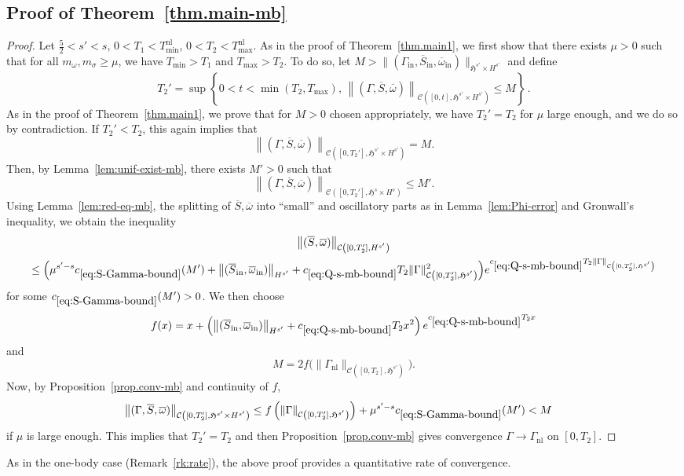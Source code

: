 \documentclass[AHL,Unicode,longabstracts,published]{cedram}
\newcommand{\rmin}{\mathrm{in}}
\newcommand{\nl}{\mathrm{nl}}
\newcommand{\cC}{\mathcal{C}}
\newcommand{\gH}{\mathfrak{H}}
\begin{document}
\subsection*{Proof of Theorem~\ref{thm.main-mb}}
\begin{proof}
Let $\tfrac52 <s'<s$, $0<T_1<T_{\min}^{\nl}$, $0<T_2<T_{\max}^{\nl}$. As in the proof of Theorem~\ref{thm.main1}, we first show that there exists $\mu>0$ such that for all $m_\omega,m_\sigma\geq \mu$, we have $T_{\min}>T_1$ and $T_{\max}>T_2$. To do so, let $M>\|(\Gamma_{\rmin}, \overline{S}_\rmin, \overline{\omega}_\rmin)\|_{\gH^{s'}\times H^{s'}}$ and define
\[
T_2' = \sup\left\{0<t<\min(T_2,T_{\max}),\,\left\|(\Gamma,\overline{S}, \overline{\omega})\right\|_{\cC\left([0,t], \gH^{s'}\times H^{s'}\right)}\leq M\right\}\,.
\]
As in the proof of Theorem~\ref{thm.main1}, we prove that for $M>0$ chosen appropriately, we have $T_2'=T_2$ for $\mu$ large enough, and we do so by contradiction. If $T_2'<T_2$, this again implies that
\[
\left\|(\Gamma,\overline{S}, \overline{\omega})\right\|_{\cC\left([0,T_2'],\gH^{s'}\times H^{s'}\right)}=M.
\]
Then, by Lemma~\ref{lem:unif-exist-mb}, there exists $M'>0$ such that
\begin{equation}
\left\|(\Gamma, \overline{S}, \overline{\omega})\right\|_{\cC\left([0,T_2'],\gH^s\times H^s\right)} \leq M'.
\end{equation}
Using Lemma~\ref{lem:red-eq-mb}, the splitting of $\overline{S}, \overline{\omega}$ into ``small'' and oscillatory parts as in Lemma~\ref{lem:Phi-error} and Gronwall's inequality, we obtain the inequality
\begin{multline}\label{eq:S-Gamma-bound}
\left\|(\overline{S},\overline{\omega})\right\|_{\cC\left([0,T_2'],H^{s'}\right)}\\
\leq \Big(\mu^{s'-s}c_{\eqref{eq:S-Gamma-bound}}(M') + \left\|(\overline{S}_\rmin,\overline{\omega}_\rmin)\right\|_{H^{s'}} + c_{\eqref{eq:Q-s-mb-bound}} T_2 \|\Gamma\|_{\cC\left([0,T_2'],\gH^{s'}\right)}^2 \Big) e^{c_{\eqref{eq:Q-s-mb-bound}} T_2 \|\Gamma\|_{\cC\left([0,T_2'],\gH^{s'}\right)}}
\end{multline}
for some $c_{\eqref{eq:S-Gamma-bound}}(M')>0$. We then choose
\begin{equation}
f(x)=x+ \left(\left\|(\overline{S}_\rmin,\overline{\omega}_\rmin)\right\|_{H^{s'}} + c_{\eqref{eq:Q-s-mb-bound}} T_2x^2\right)e^{c_{\eqref{eq:Q-s-mb-bound}} T_2 x}
\end{equation}
and
\begin{equation}
M=2 f\big(\|\Gamma_\nl\|_{\cC\left([0,T_2],\gH^{s'}\right)}\big).
\end{equation}
Now, by Proposition~\ref{prop.conv-mb} and continuity of $f$,
\begin{align*}
\left\|(\Gamma,\overline{S}, \overline{\omega})\right\|_{\cC\left([0,T_2'],\gH^{s'}\times H^{s'}\right)} &\leq f\left(\|\Gamma\|_{\cC\left([0,T_2'],\gH^{s'}\right)}\right) + \mu^{s'-s}c_{\eqref{eq:S-Gamma-bound}}(M')<M
\end{align*}
if $\mu$ is large enough. This implies that $T_2'=T_2$ and then Proposition~\ref{prop.conv-mb} gives convergence $\Gamma\to \Gamma_\nl$ on $[0,T_2]$.
\end{proof}


\begin{rema}\label{rk:rate-mb}
As in the one-body case (Remark~\ref{rk:rate}), the above proof provides a quantitative rate of convergence.
\end{rema}



\end{document}
